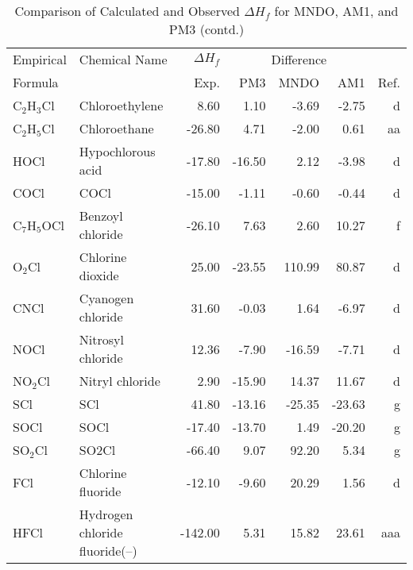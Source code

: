 \begin{table}
\caption{Comparison of Calculated and Observed $\Delta H_f$ 
for MNDO, AM1, and PM3 (contd.)}
\begin{center}
\compresstable
\begin{tabular}{llrrrrr}
Empirical & Chemical Name & $\Delta H_f$ & \multicolumn{3}{c}{Difference} & \\
Formula   &               & Exp. & PM3 &  MNDO  &  AM1 &     Ref.\\
\hline
 C$_2$H$_3$Cl      & Chloroethylene                  &     8.60    &     1.10  &    -3.69  &    -2.75  &      d\\
 C$_2$H$_5$Cl      & Chloroethane                    &   -26.80    &     4.71  &    -2.00  &     0.61  &     aa\\
 HOCl        & Hypochlorous acid               &   -17.80    &   -16.50  &     2.12  &    -3.98  &      d\\
 COCl        & COCl                            &   -15.00    &    -1.11  &    -0.60  &    -0.44  &      d\\
 C$_7$H$_5$OCl     & Benzoyl chloride                &   -26.10    &     7.63  &     2.60  &    10.27  &      f\\
 O$_2$Cl        & Chlorine dioxide                &    25.00    &   -23.55  &   110.99  &    80.87  &      d\\
 CNCl        & Cyanogen chloride               &    31.60    &    -0.03  &     1.64  &    -6.97  &      d\\
 NOCl        & Nitrosyl chloride               &    12.36    &    -7.90  &   -16.59  &    -7.71  &      d\\
 NO$_2$Cl       & Nitryl chloride                 &     2.90    &   -15.90  &    14.37  &    11.67  &      d\\
 SCl         & SCl                             &    41.80    &   -13.16  &   -25.35  &   -23.63  &      g\\
 SOCl        & SOCl                            &   -17.40    &   -13.70  &     1.49  &   -20.20  &      g\\
 SO$_2$Cl       & SO2Cl                           &   -66.40    &     9.07  &    92.20  &     5.34  &      g\\
 FCl         & Chlorine fluoride               &   -12.10    &    -9.60  &    20.29  &     1.56  &      d\\
 HFCl        & Hydrogen chloride fluoride(--)   &  -142.00    &     5.31  &    15.82  &    23.61  &    aaa\\

\end{tabular}
\end{center}
\end{table}
